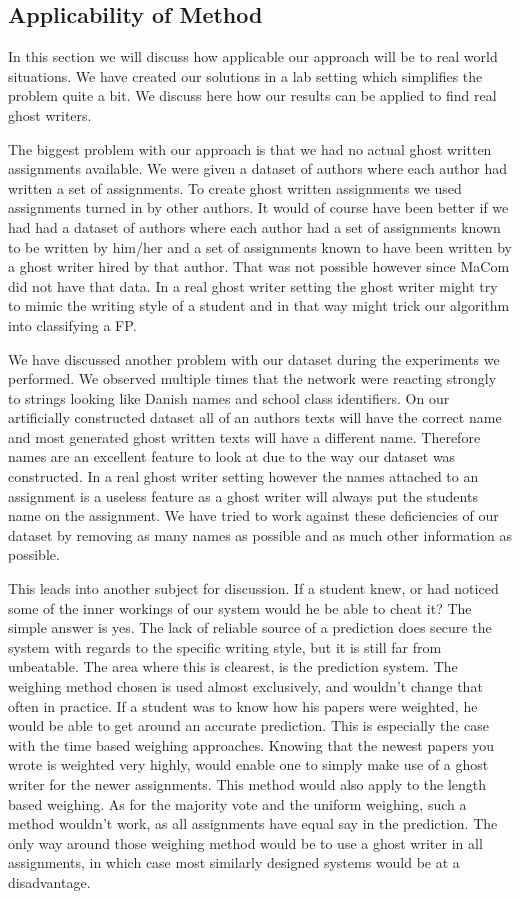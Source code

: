 \subsection{Applicability of Method}\label{sec:app_of_method}

In this section we will discuss how applicable our approach will be to real
world situations. We have created our solutions in a lab setting which
simplifies the problem quite a bit. We discuss here how our results can be
applied to find real ghost writers.

The biggest problem with our approach is that we had no actual ghost written
assignments available. We were given a dataset of authors where each author had
written a set of assignments. To create ghost written assignments we used
assignments turned in by other authors. It would of course have been better if
we had had a dataset of authors where each author had a set of assignments known
to be written by him/her and a set of assignments known to have been written by
a ghost writer hired by that author. That was not possible however since MaCom
did not have that data. In a real ghost writer setting the ghost writer might
try to mimic the writing style of a student and in that way might trick our
algorithm into classifying a \gls{FP}.

We have discussed another problem with our dataset during the experiments we
performed. We observed multiple times that the network were reacting strongly
to strings looking like Danish names and school class identifiers. On our
artificially constructed dataset all of an authors texts will have the correct
name and most generated ghost written texts will have a different name.
Therefore names are an excellent feature to look at due to the way our dataset
was constructed. In a real ghost writer setting however the names attached to an
assignment is a useless feature as a ghost writer will always put the students
name on the assignment. We have tried to work against these deficiencies of our
dataset by removing as many names as possible and as much other information as
possible.

This leads into another subject for discussion. If a student knew, or had
noticed some of the inner workings of our system would he be able to cheat it?
The simple answer is yes. The lack of reliable source of a prediction does
secure the system with regards to the specific writing style, but it is still
far from unbeatable. The area where this is clearest, is the prediction system.
The weighing method chosen is used almost exclusively, and wouldn't change that
often in practice. If a student was to know how his papers were weighted, he
would be able to get around an accurate prediction. This is especially the case
with the time based weighing approaches. Knowing that the newest papers you
wrote is weighted very highly, would enable one to simply make use of a ghost
writer for the newer assignments. This method would also apply to the length
based weighing. As for the majority vote and the uniform weighing, such a method
wouldn't work, as all assignments have equal say in the prediction. The only way
around those weighing method would be to use a ghost writer in all assignments,
in which case most similarly designed systems would be at a disadvantage.

